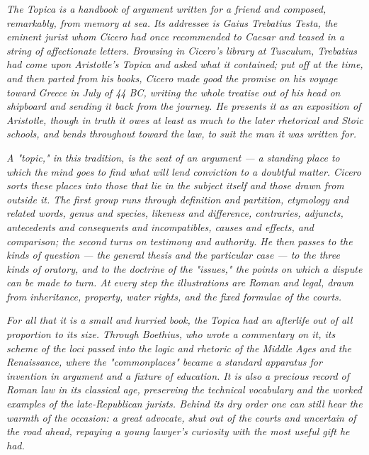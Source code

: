 
\textit{The \textit{Topica} is a handbook of argument written for a
friend and composed, remarkably, from memory at sea. Its addressee is
Gaius Trebatius Testa, the eminent jurist whom Cicero had once
recommended to Caesar and teased in a string of affectionate letters.
Browsing in Cicero's library at Tusculum, Trebatius had come upon
Aristotle's \textit{Topica} and asked what it contained; put off at the
time, and then parted from his books, Cicero made good the promise on his
voyage toward Greece in July of 44 BC, writing the whole treatise out of
his head on shipboard and sending it back from the journey. He presents
it as an exposition of Aristotle, though in truth it owes at least as much
to the later rhetorical and Stoic schools, and bends throughout toward
the law, to suit the man it was written for.}

\textit{A "topic," in this tradition, is the seat of an argument --- a
standing place to which the mind goes to find what will lend conviction
to a doubtful matter. Cicero sorts these places into those that lie in
the subject itself and those drawn from outside it. The first group runs
through definition and partition, etymology and related words, genus and
species, likeness and difference, contraries, adjuncts, antecedents and
consequents and incompatibles, causes and effects, and comparison; the
second turns on testimony and authority. He then passes to the kinds of
question --- the general thesis and the particular case --- to the three
kinds of oratory, and to the doctrine of the "issues," the points on
which a dispute can be made to turn. At every step the illustrations are
Roman and legal, drawn from inheritance, property, water rights, and the
fixed formulae of the courts.}

\textit{For all that it is a small and hurried book, the \textit{Topica}
had an afterlife out of all proportion to its size. Through Boethius, who
wrote a commentary on it, its scheme of the loci passed into the logic
and rhetoric of the Middle Ages and the Renaissance, where the
"commonplaces" became a standard apparatus for invention in argument and
a fixture of education. It is also a precious record of Roman law in its
classical age, preserving the technical vocabulary and the worked
examples of the late-Republican jurists. Behind its dry order one can
still hear the warmth of the occasion: a great advocate, shut out of the
courts and uncertain of the road ahead, repaying a young lawyer's
curiosity with the most useful gift he had.}
